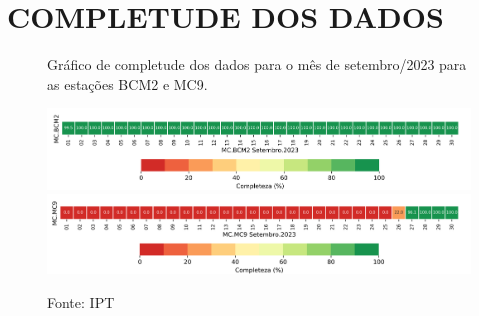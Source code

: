 \section{COMPLETUDE DOS DADOS}

\begin{figure}[htb!]
    \centering
	\captionsetup{justification=raggedright, singlelinecheck=false, width=1\textwidth}
    \caption{Gráfico de completude dos dados para o mês de setembro/2023 para as estações BCM2 e MC9.}
    \begin{mdframed}[
        linecolor=black,
        linewidth=1pt,
        roundcorner=10pt,
    ]
    \includegraphics[width=1.0\textwidth]{./machadinho/figuras/completude_BCM2.png} %
    \includegraphics[width=1.0\textwidth]{./machadinho/figuras/completude_MC9.png}
    \end{mdframed}
    \caption*{Fonte: IPT}
    \label{fig:completude}
\end{figure}

